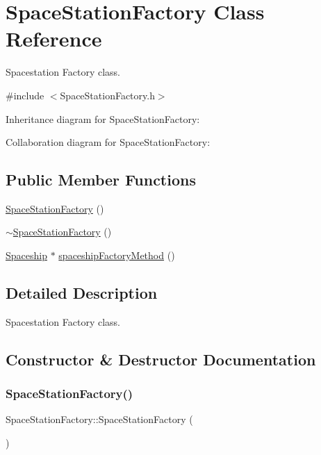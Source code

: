 \hypertarget{classSpaceStationFactory}{}\section{Space\+Station\+Factory Class Reference}
\label{classSpaceStationFactory}


Spacestation Factory class.  




{\ttfamily \#include $<$Space\+Station\+Factory.\+h$>$}



Inheritance diagram for Space\+Station\+Factory\+:


Collaboration diagram for Space\+Station\+Factory\+:
\subsection*{Public Member Functions}
\begin{DoxyCompactItemize}
\item 
\hyperlink{classSpaceStationFactory_a6f17e032052e7bdd507a52947dbd7362}{Space\+Station\+Factory} ()
\item 
\hyperlink{classSpaceStationFactory_ae6428ec2e2302246b5e283ff6fee31cd}{$\sim$\+Space\+Station\+Factory} ()
\item 
\hyperlink{classSpaceship}{Spaceship} $\ast$ \hyperlink{classSpaceStationFactory_a7264b3120ab76303b49a5416e834f5d4}{spaceship\+Factory\+Method} ()
\end{DoxyCompactItemize}


\subsection{Detailed Description}
Spacestation Factory class. 

\subsection{Constructor \& Destructor Documentation}
\mbox{\label{classSpaceStationFactory_a6f17e032052e7bdd507a52947dbd7362}} 
\subsubsection{\texorpdfstring{Space\+Station\+Factory()}{SpaceStationFactory()}}
{\footnotesize\ttfamily Space\+Station\+Factory\+::\+Space\+Station\+Factory (\begin{DoxyParamCaption}{ }\end{DoxyParamCaption})}

